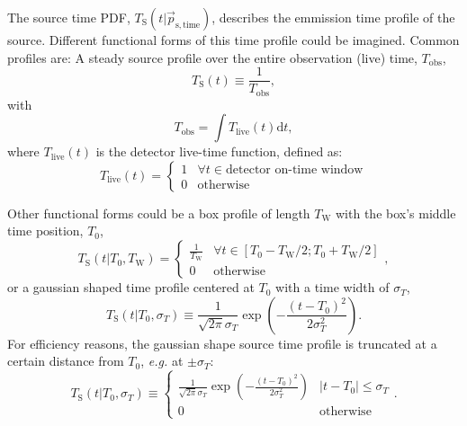 \documentclass{article}
\begin{document}
The source time PDF, $T_{\mathrm{S}}(t|\vec{p}_{\mathrm{s},\mathrm{time}})$, describes the emmission time profile
of the source. Different functional forms of this time profile could be imagined.
Common profiles are:
A steady source profile over the entire observation (live) time,
$T_{\mathrm{obs}}$,
\begin{equation}
 T_{\mathrm{S}}(t) \equiv \frac{1}{T_{\mathrm{obs}}},
\end{equation}
with
\begin{equation}
 T_{\mathrm{obs}} = \int T_{\mathrm{live}}(t) \mathrm{d}t,
 \label{eq:Tobs}
\end{equation}
where $T_{\mathrm{live}}(t)$ is the detector live-time function, defined as:
\begin{equation}
 T_{\mathrm{live}}(t) = \begin{cases}
                         1 & \forall t \in \text{detector on-time window} \\
                         0 & \text{otherwise}
                        \end{cases}
\end{equation}

Other functional forms could be a box profile of length $T_{\mathrm{W}}$ with
the box's middle time position, $T_{0}$,
\begin{equation}
 T_{\mathrm{S}}(t|T_0,T_{\mathrm{W}}) =
   \begin{cases}
     \frac{1}{T_{\mathrm{W}}} & \forall t \in \left[T_0 - T_{\mathrm{W}}/2; T_0 + T_{\mathrm{W}}/2 \right]\\
     0 & \mathrm{otherwise}
   \end{cases},
\end{equation}
or a gaussian shaped time profile centered at $T_0$ with a time width of $\sigma_T$,
\begin{equation}
 T_{\mathrm{S}}(t|T_0,\sigma_T) \equiv \frac{1}{\sqrt{2\pi}\sigma_T}\exp\left(-\frac{(t - T_0)^2}{2\sigma_T^2}\right).
\end{equation}
For efficiency reasons, the gaussian shape source time profile is truncated at
a certain distance from $T_0$, \emph{e.g.} at $\pm\sigma_T$:
\begin{equation}
 T_{\mathrm{S}}(t|T_0,\sigma_T) \equiv
   \begin{cases}
     \frac{1}{\sqrt{2\pi}\sigma_T}\exp\left(-\frac{(t - T_0)^2}{2\sigma_T^2}\right) & \left|t-T_0\right| \le \sigma_T\\
     0 & \mathrm{otherwise}
   \end{cases}.
\end{equation}
\end{document}
